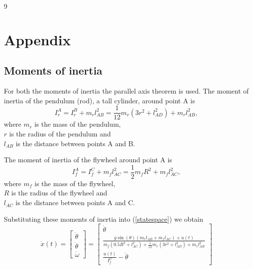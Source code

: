 \documentclass{article}
\begin{document}
\begin{thebibliography}{9}





\end{thebibliography}

\clearpage
\section{Appendix} \label{appendix}
\subsection{Moments of inertia} \label{moi}

For both the moments of inertia the parallel axis theorem is used. The moment of inertia of the pendulum (rod), a tall cylinder, around point A is 
$$I_r^A = I_r^B + m_r l^2_{AB} = \frac{1}{12} m_r(3r^2 + l^2_{AD}) + m_r l^2_{AB},$$
where $m_r$ is the mass of the pendulum, \\
$r$ is the radius of the pendulum and \\
$l_{AB}$ is the distance between points A and B.

The moment of inertia of the flywheel around point A is 
$$I_f^A = I_f^C + m_f l^2_{AC} = \frac{1}{2} m_f R^2 + m_f l^2_{AC},$$
where $m_f$ is the mass of the flywheel, \\
$R$ is the radius of the flywheel and \\
$l_{AC}$ is the distance between points A and C.

Substituting these moments of inertia into (\ref{statespace}) we obtain
$$
\dot{x}(t) = 
\begin{bmatrix}
\dot{\theta} \\
\ddot{\theta} \\
\dot{\omega}
\end{bmatrix}
=
\begin{bmatrix}
\dot{\theta} \\
\frac{g \sin(\theta) (m_r l_{AB} + m_f l_{AC}) + u(t)}
{m_f (0.5 R^2 + l_{AC}^2) + \frac{1}{12} m_r (3r^2 + l_{AD}^2) + m_r l_{AB}^2} \\
\frac{u(t)}{I_f^C} - \ddot{\theta}
\end{bmatrix}
$$
\end{document}
